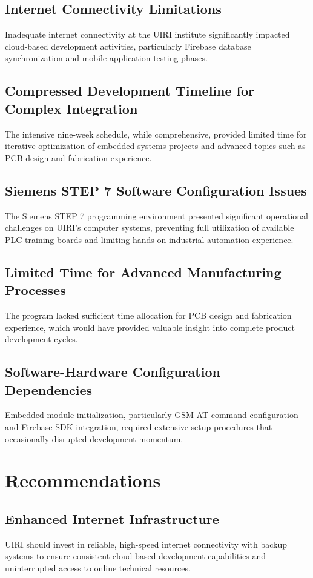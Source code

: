 \documentclass[12pt,a4paper]{report}
\begin{document}
\subsection{Internet Connectivity Limitations}
\noindent Inadequate internet connectivity at the UIRI institute significantly impacted cloud-based development activities, particularly Firebase database synchronization and mobile application testing phases.

\subsection{Compressed Development Timeline for Complex Integration}
\noindent The intensive nine-week schedule, while comprehensive, provided limited time for iterative optimization of embedded systems projects and advanced topics such as PCB design and fabrication experience.

\subsection{Siemens STEP 7 Software Configuration Issues}
\noindent The Siemens STEP 7 programming environment presented significant operational challenges on UIRI's computer systems, preventing full utilization of available PLC training boards and limiting hands-on industrial automation experience.

\subsection{Limited Time for Advanced Manufacturing Processes}
\noindent The program lacked sufficient time allocation for PCB design and fabrication experience, which would have provided valuable insight into complete product development cycles.

\subsection{Software-Hardware Configuration Dependencies}
\noindent Embedded module initialization, particularly GSM AT command configuration and Firebase SDK integration, required extensive setup procedures that occasionally disrupted development momentum.

\section{Recommendations}

\subsection{Enhanced Internet Infrastructure}
\noindent UIRI should invest in reliable, high-speed internet connectivity with backup systems to ensure consistent cloud-based development capabilities and uninterrupted access to online technical resources.
\end{document}
